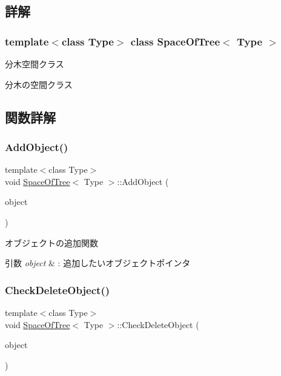 \subsection{詳解}
\subsubsection*{template$<$class Type$>$\newline
class Space\+Of\+Tree$<$ Type $>$}

分木空間クラス 

分木の空間クラス 

\subsection{関数詳解}
\mbox{\label{class_space_of_tree_a8156722056d7b2ab354ff22235772d7e}} 
\subsubsection{\texorpdfstring{Add\+Object()}{AddObject()}}
{\footnotesize\ttfamily template$<$class Type$>$ \\
void \mbox{\hyperlink{class_space_of_tree}{Space\+Of\+Tree}}$<$ Type $>$\+::Add\+Object (\begin{DoxyParamCaption}\item[{\mbox{\hyperlink{class_object_of_tree}{Object\+Of\+Tree}}$<$ Type $>$ $\ast$}]{object }\end{DoxyParamCaption})\hspace{0.3cm}{\ttfamily [inline]}}



オブジェクトの追加関数 


\begin{DoxyParams}{引数}
{\em object} & \+: 追加したいオブジェクトポインタ \\
\hline
\end{DoxyParams}
\mbox{\label{class_space_of_tree_a746aef6b3bafdde17daa5125cc9bc43c}} 
\subsubsection{\texorpdfstring{Check\+Delete\+Object()}{CheckDeleteObject()}}
{\footnotesize\ttfamily template$<$class Type$>$ \\
void \mbox{\hyperlink{class_space_of_tree}{Space\+Of\+Tree}}$<$ Type $>$\+::Check\+Delete\+Object (\begin{DoxyParamCaption}\item[{\mbox{\hyperlink{class_object_of_tree}{Object\+Of\+Tree}}$<$ Type $>$ $\ast$}]{object }\end{DoxyParamCaption})\hspace{0.3cm}{\ttfamily [inline]}}



